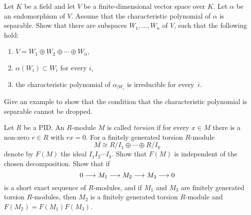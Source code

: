 \begin{exercise}
Let $K$ be a field and let $V$ be a finite-dimensional vector space over $K$. Let $\alpha$ be an endomorphism of $V$. Assume that the characteristic polynomial of $\alpha$ is separable. Show that there are subspaces $W_1,\ldots, W_n$ of $V$, such that the following hold:
\begin{enumerate}
\item  $V = W_1 \oplus W_2 \oplus \cdots \oplus W_n$,
\item $\alpha(W_i) \subset W_i$ for every $i$,
\item the characteristic polynomial of $\alpha_{|W_i}$ is irreducible for every~$i$.
\end{enumerate}
Give an example to show that the condition that the characteristic polynomial is separable cannot be dropped.
\end{exercise}


\begin{exercise}[$\star\star$]
Let $R$ be a PID. An $R$-module $M$ is called \emph{torsion} if for every $x\in M$ there is a non-zero $r\in R$ with $rx=0$. 
For a finitely generated torsion $R$-module
\[
	M\cong R/I_1 \oplus \cdots \oplus R/I_k
\]
denote by $F(M)$ the ideal $I_1I_2\cdots I_k$. Show that $F(M)$ is independent of the chosen decomposition. Show that if 
\[
	0 \longrightarrow M_1 \longrightarrow M_2 \longrightarrow M_3 \longrightarrow 0
\]
is a short exact sequence of $R$-modules, and if $M_1$ and $M_3$ are finitely generated torsion $R$-modules, then $M_2$ is a finitely generated torsion $R$-module and $F(M_2)=F(M_1)F(M_3)$.
\end{exercise}


